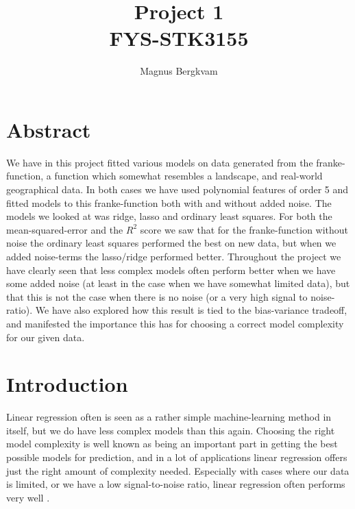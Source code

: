 \documentclass{article}
\author{Magnus Bergkvam}
\title{Project 1 \\ FYS-STK3155}
\begin{document}
\maketitle


\section{Abstract}
We have in this project fitted various models on data generated from the
franke-function, a function which somewhat resembles a landscape, and real-world
geographical data. In both cases we have used polynomial features of
order 5 and fitted models to this franke-function both with and without added
noise.  The models we looked at was ridge, lasso and ordinary least squares.
For both the mean-squared-error and the $R^2$ score we saw that for the
franke-function without noise the ordinary least squares performed the best on
new data, but when we added noise-terms the lasso/ridge performed better.
Throughout the project we have clearly seen that less complex models often
perform better when we have some added noise (at least in the case when we have
somewhat limited data), but that this is not the case when there is no noise (or
a very high signal to noise-ratio). We have also explored how this result is
tied to the bias-variance tradeoff, and manifested the importance this has for
choosing a correct model complexity for our given data.

\section{Introduction}
Linear regression often is seen as a rather simple machine-learning method in
itself, but we do have less complex models than this again. Choosing the right
model complexity is well known as being an important part in getting the best
possible models for prediction, and in a lot of applications linear regression
offers just the right amount of complexity needed. Especially with cases where
our data is limited, or we have a low signal-to-noise ratio, linear regression
often performs very well \cite[p.~43]{hastie2009elements}. \\
\end{document}
